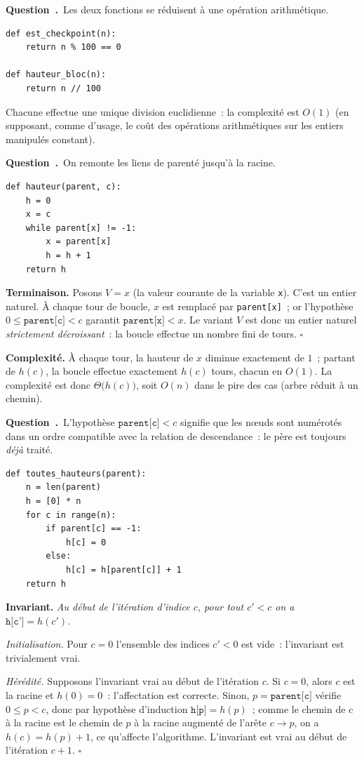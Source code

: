 \documentclass[11pt,a4paper]{article}
\renewcommand{\Q}{\medskip\par\stepcounter{qcnt}\noindent\textbf{\color{cnc}Question~\theqcnt.}~}
\begin{document}
\Q Les deux fonctions se réduisent à une opération arithmétique.
\begin{lstlisting}
def est_checkpoint(n):
    return n % 100 == 0

def hauteur_bloc(n):
    return n // 100
\end{lstlisting}
Chacune effectue une unique division euclidienne~: la complexité est $O(1)$ (en supposant,
comme d'usage, le coût des opérations arithmétiques sur les entiers manipulés constant).

\Q On remonte les liens de parenté jusqu'à la racine.
\begin{lstlisting}
def hauteur(parent, c):
    h = 0
    x = c
    while parent[x] != -1:
        x = parent[x]
        h = h + 1
    return h
\end{lstlisting}
\textbf{Terminaison.} Posons $V = x$ (la valeur courante de la variable \texttt{x}). C'est un
entier naturel. À chaque tour de boucle, $x$ est remplacé par \texttt{parent[x]}~; or
l'hypothèse $0\le\texttt{parent[c]}<c$ garantit $\texttt{parent[x]}<x$. Le variant $V$ est
donc un entier naturel \emph{strictement décroissant}~: la boucle effectue un nombre fini de
tours. \hfill$\square$

\textbf{Complexité.} À chaque tour, la hauteur de $x$ diminue exactement de $1$~; partant de
$h(c)$, la boucle effectue exactement $h(c)$ tours, chacun en $O(1)$. La complexité est donc
$\Theta\big(h(c)\big)$, soit $O(n)$ dans le pire des cas (arbre réduit à un chemin).

\Q L'hypothèse $\texttt{parent[c]}<c$ signifie que les n\oe uds sont numérotés dans un ordre
compatible avec la relation de descendance~: le père est toujours \emph{déjà} traité.
\begin{lstlisting}
def toutes_hauteurs(parent):
    n = len(parent)
    h = [0] * n
    for c in range(n):
        if parent[c] == -1:
            h[c] = 0
        else:
            h[c] = h[parent[c]] + 1
    return h
\end{lstlisting}
\textbf{Invariant.} \emph{Au début de l'itération d'indice $c$, pour tout $c'<c$ on a
$\texttt{h[c']}=h(c')$.}

\emph{Initialisation.} Pour $c=0$ l'ensemble des indices $c'<0$ est vide~: l'invariant est
trivialement vrai.

\emph{Hérédité.} Supposons l'invariant vrai au début de l'itération $c$. Si $c=0$, alors
$c$ est la racine et $h(0)=0$~: l'affectation est correcte. Sinon, $p=\texttt{parent[c]}$
vérifie $0\le p<c$, donc par hypothèse d'induction $\texttt{h[p]}=h(p)$~; comme le chemin de
$c$ à la racine est le chemin de $p$ à la racine augmenté de l'arête $c\to p$, on a
$h(c)=h(p)+1$, ce qu'affecte l'algorithme. L'invariant est vrai au début de l'itération
$c+1$. \hfill$\square$
\end{document}
